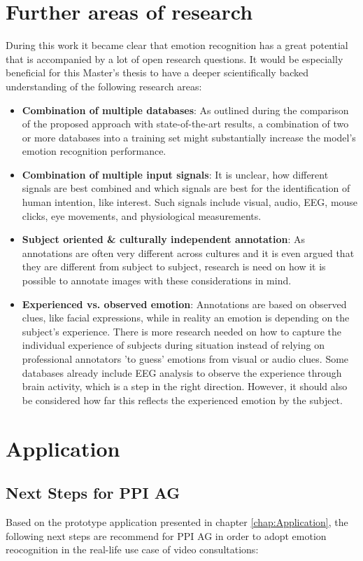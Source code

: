 \section{Further areas of research}
During this work it became clear that emotion recognition has a great potential that is accompanied by a lot of open research questions. It would be especially beneficial for this Master's thesis to have a deeper scientifically backed understanding of the following research areas:
\begin{itemize}
    \item \textbf{Combination of multiple databases}:  As outlined during the comparison of the proposed approach with state-of-the-art results, a combination of two or more databases into a training set might substantially increase the model's emotion recognition performance.
    \item \textbf{Combination of multiple input signals}: It is unclear, how different signals are best combined and which signals are best for the identification of human intention, like interest. Such signals include visual, audio, EEG, mouse clicks, eye movements, and physiological measurements.
    \item \textbf{Subject oriented \& culturally independent annotation}: As annotations are often very different across cultures and it is even argued that they are different from subject to subject, research is need on how it is possible to annotate images with these considerations in mind. 
    \item \textbf{Experienced vs. observed emotion}: Annotations are based on observed clues, like facial expressions, while in reality an emotion is depending on the subject's experience. There is more research needed on how to capture the individual experience of subjects during situation instead of relying on professional annotators 'to guess' emotions from visual or audio clues. Some databases already include EEG analysis to observe the experience through brain activity, which is a step in the right direction. However, it should also be considered how far this reflects the experienced emotion by the subject.
\end{itemize}



\section{Application}
\subsection{Next Steps for PPI AG}
Based on the prototype application presented in chapter \ref{chap:Application}, the following next steps are recommend for PPI AG in order to adopt emotion reocognition in the real-life use case of video consultations:

